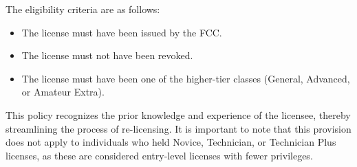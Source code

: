 The eligibility criteria are as follows:
\begin{itemize}
    \item The license must have been issued by the FCC.
    \item The license must not have been revoked.
    \item The license must have been one of the higher-tier classes (General, Advanced, or Amateur Extra).
\end{itemize}

This policy recognizes the prior knowledge and experience of the licensee, thereby streamlining the process of re-licensing. It is important to note that this provision does not apply to individuals who held Novice, Technician, or Technician Plus licenses, as these are considered entry-level licenses with fewer privileges.

